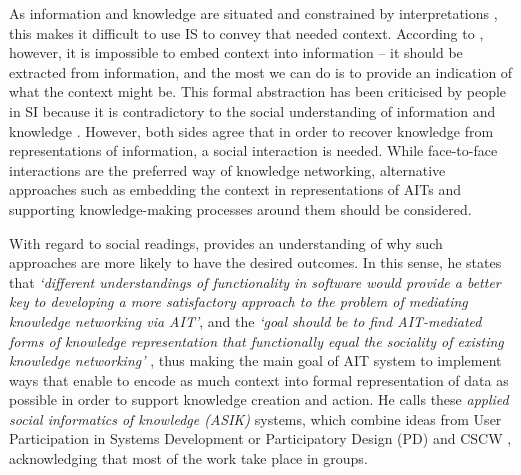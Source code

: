 As information and knowledge are situated and constrained by interpretations \citep{suchman_plans_1985,suchman_human-machine_2007}, this makes it difficult to use IS to convey that needed context. According to \citet{devlin_infosense:_2001}, however, it is impossible to embed context into information -- it should be extracted from information, and the most we can do is to provide an indication of what the context might be. This formal abstraction has been criticised by people in SI because it is contradictory to the social understanding of information and knowledge \citep{hakken_social_2003}. However, both sides agree that in order to recover knowledge from representations of information, a social interaction is needed. While face-to-face interactions are the preferred way of knowledge networking, alternative approaches such as embedding the context in representations of AITs and supporting knowledge-making processes around them should be considered.

With regard to social readings, \citet{hakken_social_2003} provides an understanding of why such approaches are more likely to have the desired outcomes. In this sense, he states that \textit{`different understandings of functionality in software would provide a better key to developing a more satisfactory approach to the problem of mediating knowledge networking via AIT'}, and the \textit{`goal should be to find AIT-mediated forms of knowledge representation that functionally equal the sociality of existing knowledge networking'} \citep[p. 156]{hakken_social_2003}, thus making the main goal of AIT system to implement ways that enable to encode as much context into formal representation of data as possible in order to support knowledge creation and action. He calls these \textit{applied social informatics of knowledge (ASIK)} systems, which combine ideas from User Participation in Systems Development or Participatory Design (PD) \citep{dahlbom_computers_1993} and CSCW \citep{winograd_understanding_1986}, acknowledging that most of the work take place in groups. 

